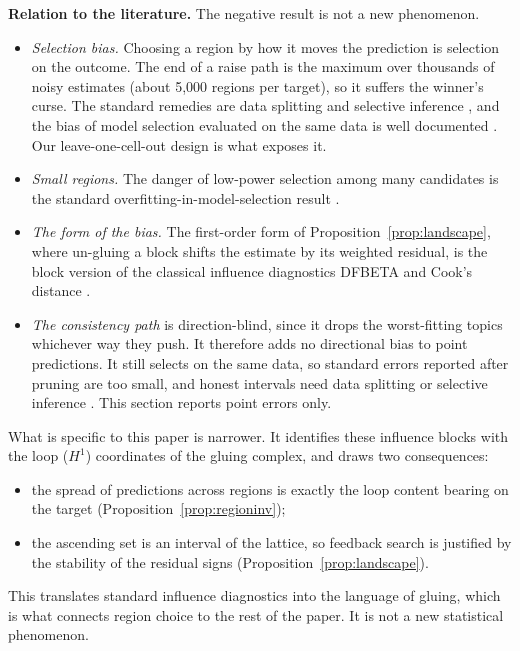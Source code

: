 \documentclass[11pt]{article}
\theoremstyle{definition}
\theoremstyle{remark}
\begin{document}
\textbf{Relation to the literature.} The negative result is not a new phenomenon.
\begin{itemize}
  \item \emph{Selection bias.} Choosing a region by how it moves the prediction is selection on the outcome. The end of a raise path is the maximum over thousands of noisy estimates (about 5{,}000 regions per target), so it suffers the winner's curse. The standard remedies are data splitting \cite{cox75} and selective inference \cite{posi,fithian}, and the bias of model selection evaluated on the same data is well documented \cite{varma06,cawley10}. Our leave-one-cell-out design is what exposes it.
  \item \emph{Small regions.} The danger of low-power selection among many candidates is the standard overfitting-in-model-selection result \cite{cawley10}.
  \item \emph{The form of the bias.} The first-order form of Proposition~\ref{prop:landscape}, where un-gluing a block shifts the estimate by its weighted residual, is the block version of the classical influence diagnostics DFBETA and Cook's distance \cite{cook77,bkw80}.
  \item \emph{The consistency path} is direction-blind, since it drops the worst-fitting topics whichever way they push. It therefore adds no directional bias to point predictions. It still selects on the same data, so standard errors reported after pruning are too small, and honest intervals need data splitting or selective inference \cite{cox75,fithian}. This section reports point errors only.
\end{itemize}
What is specific to this paper is narrower. It identifies these influence blocks with the loop ($H^1$) coordinates of the gluing complex, and draws two consequences:
\begin{itemize}
  \item the spread of predictions across regions is exactly the loop content bearing on the target (Proposition~\ref{prop:regioninv});
  \item the ascending set is an interval of the lattice, so feedback search is justified by the stability of the residual signs (Proposition~\ref{prop:landscape}).
\end{itemize}
This translates standard influence diagnostics into the language of gluing, which is what connects region choice to the rest of the paper. It is not a new statistical phenomenon.
\end{document}
